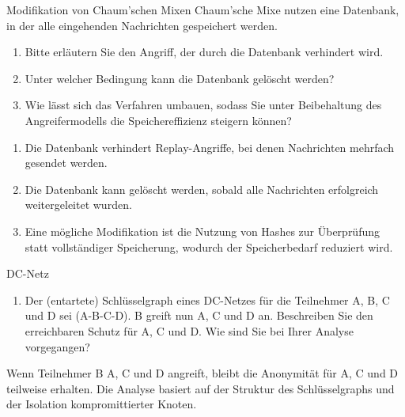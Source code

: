 \documentclass{article}
\begin{document}
\setcounter{subsection}{235}
\begin{exercise}{Modifikation von Chaum'schen Mixen}
  Chaum'sche Mixe nutzen eine Datenbank, in der alle eingehenden Nachrichten gespeichert werden.
  \begin{enumerate}
    \item Bitte erläutern Sie den Angriff, der durch die Datenbank verhindert wird.
    \item Unter welcher Bedingung kann die Datenbank gelöscht werden?
    \item Wie lässt sich das Verfahren umbauen, sodass Sie unter Beibehaltung des Angreifermodells die Speichereffizienz steigern können?
  \end{enumerate}

  \begin{solution}
    \begin{enumerate}
      \item Die Datenbank verhindert Replay-Angriffe, bei denen Nachrichten mehrfach gesendet werden.
      \item Die Datenbank kann gelöscht werden, sobald alle Nachrichten erfolgreich weitergeleitet wurden.
      \item Eine mögliche Modifikation ist die Nutzung von Hashes zur Überprüfung statt vollständiger Speicherung, wodurch der Speicherbedarf reduziert wird.
    \end{enumerate}
  \end{solution}
\end{exercise}

\begin{exercise}{DC-Netz}
  \begin{enumerate}
    \item Der (entartete) Schlüsselgraph eines DC-Netzes für die Teilnehmer A, B, C und D sei (A-B-C-D). B greift nun A, C und D an. Beschreiben Sie den erreichbaren Schutz für A, C und D. Wie sind Sie bei Ihrer Analyse vorgegangen?
  \end{enumerate}

  \begin{solution}
    Wenn Teilnehmer B A, C und D angreift, bleibt die Anonymität für A, C und D teilweise erhalten. Die Analyse basiert auf der Struktur des Schlüsselgraphs und der Isolation kompromittierter Knoten.
  \end{solution}
\end{exercise}
\end{document}
